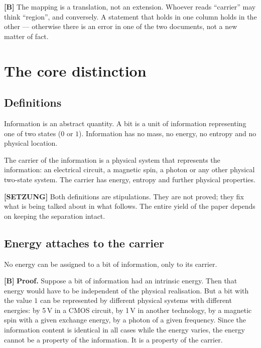 \textbf{[B]} The mapping is a translation, not an extension. Whoever reads “carrier” may
think “region”, and conversely. A statement that holds in one column holds in the
other --- otherwise there is an error in one of the two documents, not a new
matter of fact.

\section{The core distinction}

\subsection{Definitions}

\begin{definition}[Information]
Information is an abstract quantity. A bit is a unit of information representing
one of two states ($0$ or $1$). Information has no mass, no energy, no entropy and
no physical location.
\end{definition}

\begin{definition}[Carrier]
The carrier of the information is a physical system that represents the
information: an electrical circuit, a magnetic spin, a photon or any other
physical two-state system. The carrier has energy, entropy and further physical
properties.
\end{definition}

\textbf{[SETZUNG]} Both definitions are stipulations. They are not proved; they fix what is being
talked about in what follows. The entire yield of the paper depends on keeping the
separation intact.

\subsection{Energy attaches to the carrier}

\begin{theorem}
No energy can be assigned to a bit of information, only to its carrier.
\end{theorem}

\textbf{[B]} \textbf{Proof.} Suppose a bit of information had an intrinsic energy. Then that
energy would have to be independent of the physical realisation. But a bit with
the value $1$ can be represented by different physical systems with different
energies: by 5\,V in a CMOS circuit, by 1\,V in another technology, by a magnetic
spin with a given exchange energy, by a photon of a given frequency. Since the
information content is identical in all cases while the energy varies, the energy
cannot be a property of the information. It is a property of the carrier.
\hfill\qedsq

